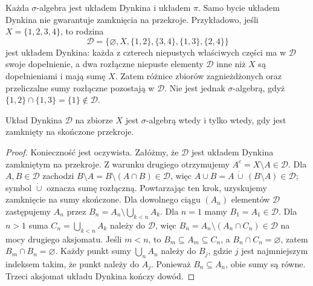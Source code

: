 Każda $\sigma$-algebra jest układem Dynkina i układem $\pi$.
Samo bycie układem Dynkina nie gwarantuje zamknięcia na przekroje.
Przykładowo, jeśli $X=\{1,2,3,4\}$, to rodzina
\[
\mathcal D=\{\varnothing,X,\{1,2\},\{3,4\},\{1,3\},\{2,4\}\}
\]
jest układem Dynkina: każda z czterech niepustych właściwych
części ma w $\mathcal D$ swoje dopełnienie, a dwa rozłączne
niepuste elementy $\mathcal D$ inne niż $X$ są dopełnieniami
i mają sumę $X$. Zatem różnice zbiorów zagnieżdżonych
oraz przeliczalne sumy rozłączne pozostają w $\mathcal D$.
Nie jest jednak $\sigma$-algebrą, gdyż
$\{1,2\}\cap\{1,3\}=\{1\}\notin\mathcal D$.

\begin{lemat}
\label{lem:dynkin-intersection}
Układ Dynkina $\mathcal D$ na zbiorze $X$ jest $\sigma$-algebrą wtedy
i tylko wtedy, gdy jest zamknięty na skończone przekroje.
\end{lemat}
\begin{proof}
Konieczność jest oczywista. Załóżmy, że $\mathcal D$ jest układem
Dynkina zamkniętym na przekroje. Z warunku drugiego otrzymujemy
$A^c=X\setminus A\in\mathcal D$. Dla $A,B\in\mathcal D$ zachodzi
$B\setminus A=B\setminus(A\cap B)\in\mathcal D$, więc
$A\cup B=A\,\dot\cup\,(B\setminus A)\in\mathcal D$; symbol
$\dot\cup$ oznacza sumę rozłączną. Powtarzając ten krok, uzyskujemy
zamknięcie na sumy skończone. Dla dowolnego ciągu $(A_n)$ elementów
$\mathcal D$ zastępujemy $A_n$ przez
$B_n=A_n\setminus\bigcup_{k<n}A_k$. Dla $n=1$ mamy $B_1=A_1\in\mathcal D$. Dla $n>1$ suma
$C_n=\bigcup_{k<n}A_k$ należy do $\mathcal D$, więc
$B_n=A_n\setminus(A_n\cap C_n)\in\mathcal D$ na mocy drugiego
aksjomatu. Jeśli $m<n$, to $B_m\subseteq A_m\subseteq C_n$,
a $B_n\cap C_n=\varnothing$, zatem $B_m\cap B_n=\varnothing$.
Każdy punkt sumy $\bigcup_n A_n$ należy do $B_j$, gdzie $j$
jest najmniejszym indeksem takim, że punkt należy do $A_j$.
Ponieważ $B_n\subseteq A_n$, obie sumy są równe.
Trzeci aksjomat układu Dynkina kończy dowód.
\end{proof}

